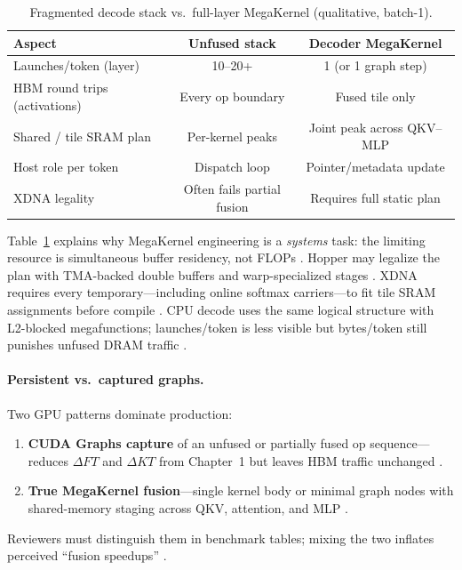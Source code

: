 \begin{table}[t]
\centering
\caption{Fragmented decode stack vs.\ full-layer MegaKernel (qualitative, batch-1).}
\label{tab:megakernel_structure}
\begin{tabular}{lcc}
\toprule
\textbf{Aspect} & \textbf{Unfused stack} & \textbf{Decoder MegaKernel} \\
\midrule
Launches/token (layer) & 10--20+ & 1 (or 1 graph step) \\
HBM round trips (activations) & Every op boundary & Fused tile only \\
Shared / tile SRAM plan & Per-kernel peaks & Joint peak across QKV--MLP \\
Host role per token & Dispatch loop & Pointer/metadata update \\
XDNA legality & Often fails partial fusion & Requires full static plan \\
\bottomrule
\end{tabular}
\end{table}

Table~\ref{tab:megakernel_structure} explains why MegaKernel engineering is a \emph{systems} task: the limiting resource is simultaneous buffer residency, not FLOPs \citep{semianalysis2024tma,nvidia2022hopper}. Hopper may legalize the plan with TMA-backed double buffers and warp-specialized stages \citep{semianalysis2024tma}. XDNA requires every temporary---including online softmax carriers---to fit tile SRAM assignments before compile \citep{amd2024aie,yirage2026}. CPU decode uses the same logical structure with L2-blocked megafunctions; launches/token is less visible but bytes/token still punishes unfused DRAM traffic \citep{dlbook,patel2025llminference}.

\paragraph{Persistent vs.\ captured graphs.} Two GPU patterns dominate production:
\begin{enumerate}
\item \textbf{CUDA Graphs capture} of an unfused or partially fused op sequence---reduces $\Delta FT$ and $\Delta KT$ from Chapter~1 but leaves HBM traffic unchanged \citep{memoryfloor2026,nvidia2024cudagraphs}.
\item \textbf{True MegaKernel fusion}---single kernel body or minimal graph nodes with shared-memory staging across QKV, attention, and MLP \citep{chen2020compilerbasedhardw,taxbreak2026}.
\end{enumerate}
Reviewers must distinguish them in benchmark tables; mixing the two inflates perceived ``fusion speedups'' \citep{patel2025llminference,memoryfloor2026}.

